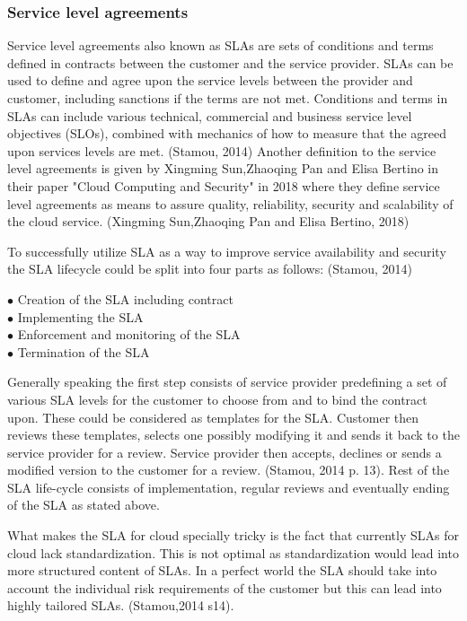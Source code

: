 \documentclass{article}
\begin{document}
\subsubsection{Service level agreements}
Service level agreements also known as SLAs are sets of conditions and terms defined in contracts between the customer and the service provider. SLAs can be used to define and agree upon the service levels between the provider and customer, including sanctions if the terms are not met. Conditions and terms in SLAs can include various technical, commercial and business service level objectives (SLOs), combined with mechanics of how to measure that the agreed upon services levels are met. (Stamou, 2014) Another definition to the service level agreements is given by Xingming Sun,Zhaoqing Pan and Elisa Bertino in their paper "Cloud Computing and Security" in 2018 where they define service level agreements as means to assure quality, reliability, security and scalability of the cloud service. (Xingming Sun,Zhaoqing Pan and Elisa Bertino, 2018) 
\par
To successfully utilize SLA as a way to improve service availability and security the SLA lifecycle could be split into four parts as follows: (Stamou, 2014)
\begin{description}
        \item[$\bullet$ Creation of the SLA including contract]
        \item[$\bullet$ Implementing the SLA]
        \item[$\bullet$ Enforcement and monitoring of the SLA]
        \item[$\bullet$ Termination of the SLA]
\end{description}
Generally speaking the first step consists of service provider predefining a set of various SLA levels for the customer to choose from and to bind the contract upon. These could be considered as templates for the SLA. Customer then reviews these templates, selects one possibly modifying it and sends it back to the service provider for a review. Service provider then accepts, declines or sends a modified version to the customer for a review. (Stamou, 2014 p. 13). Rest of the SLA life-cycle consists of implementation, regular reviews and eventually ending of the SLA as stated above.
\par
What makes the SLA for cloud specially tricky is the fact that currently SLAs for cloud lack standardization. This is not optimal as standardization would lead into more structured content of SLAs. In a perfect world the SLA should take into account the individual risk requirements of the customer but this can lead into highly tailored SLAs. (Stamou,2014 s14).
\end{document}
